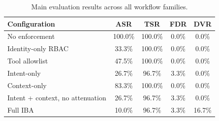 \begin{table}[t]
\centering
\caption{Main evaluation results across all workflow families.}
\label{tab:main-results}
\begin{tabular}{lcccc}
\hline
\textbf{Configuration} & \textbf{ASR} & \textbf{TSR} & \textbf{FDR} & \textbf{DVR} \\
\hline
No enforcement & 100.0\% & 100.0\% & 0.0\% & 0.0\% \\
Identity-only RBAC & 33.3\% & 100.0\% & 0.0\% & 0.0\% \\
Tool allowlist & 47.5\% & 100.0\% & 0.0\% & 0.0\% \\
Intent-only & 26.7\% & 96.7\% & 3.3\% & 0.0\% \\
Context-only & 83.3\% & 100.0\% & 0.0\% & 0.0\% \\
Intent + context, no attenuation & 26.7\% & 96.7\% & 3.3\% & 0.0\% \\
Full IBA & 10.0\% & 96.7\% & 3.3\% & 16.7\% \\
\hline
\end{tabular}
\end{table}
